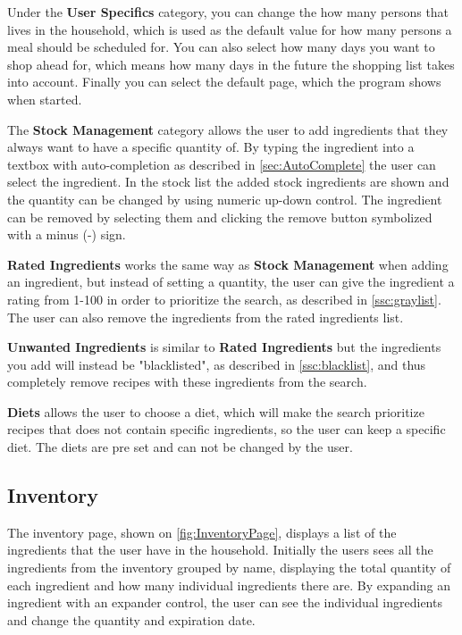 Under the \textbf{User Specifics} category, you can change the how many persons that lives in the household, which is used as the default value for how many persons a meal should be scheduled for. You can also select how many days you want to shop ahead for, which means how many days in the future the shopping list takes into account. Finally you can select the default page, which the program shows when started.

The \textbf{Stock Management} category allows the user to add ingredients that they always want to have a specific quantity of. By typing the ingredient into a textbox with auto-completion as described in \cref{sec:AutoComplete} the user can select the ingredient. In the stock list the added stock ingredients are shown and the quantity can be changed by using numeric up-down control. The ingredient can be removed by selecting them and clicking the remove button symbolized with a minus (-) sign.

\textbf{Rated Ingredients} works the same way as \textbf{Stock Management} when adding an ingredient, but instead of setting a quantity, the user can give the ingredient a rating from 1-100 in order to prioritize the search, as described in \cref{ssc:graylist}. The user can also remove the ingredients from the rated ingredients list.

\textbf{Unwanted Ingredients} is similar to \textbf{Rated Ingredients} but the ingredients you add will instead be "blacklisted", as described in \cref{ssc:blacklist}, and thus completely remove recipes with these ingredients from the search.

\textbf{Diets} allows the user to choose a diet, which will make the search prioritize recipes that does not contain specific ingredients, so the user can keep a specific diet. The diets are pre set and can not be changed by the user.

\subsection{Inventory} \label{ss:inventory}
The inventory page, shown on \cref{fig:InventoryPage}, displays a list of the ingredients that the user have in the household. Initially the users sees all the ingredients from the inventory grouped by name, displaying the total quantity of each ingredient and how many individual ingredients there are. By expanding an ingredient with an expander control, the user can see the individual ingredients and change the quantity and expiration date.

